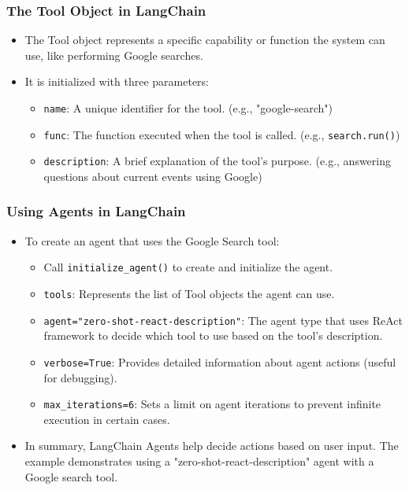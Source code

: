 \begin{frame}[fragile]
\frametitle{The Tool Object in LangChain}

\begin{itemize}
    \item The Tool object represents a specific capability or function the system can use, like performing Google searches.
    \item It is initialized with three parameters:
    \begin{itemize}
        \item \texttt{name}: A unique identifier for the tool. (e.g., "google-search")
        \item \texttt{func}: The function executed when the tool is called. (e.g., \texttt{search.run()})
        \item \texttt{description}: A brief explanation of the tool's purpose. (e.g., answering questions about current events using Google)
    \end{itemize}
\end{itemize}

\end{frame}

\begin{frame}[fragile]
\frametitle{Using Agents in LangChain}

\begin{itemize}
    \item To create an agent that uses the Google Search tool:
    \begin{itemize}
        \item Call \texttt{initialize\_agent()} to create and initialize the agent.
        \item \texttt{tools}: Represents the list of Tool objects the agent can use.
        \item \texttt{agent="zero-shot-react-description"}: The agent type that uses ReAct framework to decide which tool to use based on the tool's description.
        \item \texttt{verbose=True}: Provides detailed information about agent actions (useful for debugging).
        \item \texttt{max\_iterations=6}: Sets a limit on agent iterations to prevent infinite execution in certain cases.
    \end{itemize}
    \item In summary, LangChain Agents help decide actions based on user input. The example demonstrates using a "zero-shot-react-description" agent with a Google search tool.
\end{itemize}

\end{frame}

